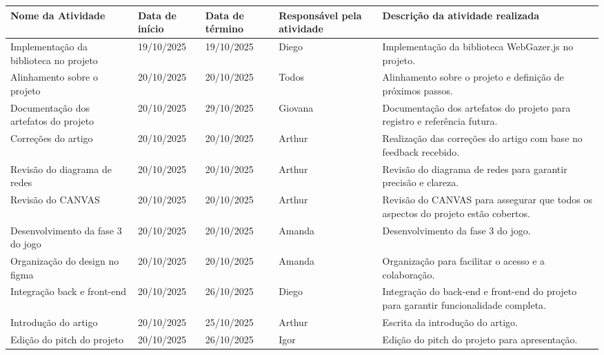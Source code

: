 \documentclass[
landscape,
  a4paper,%
  12pt,%
  english,%
  brazilian,%
]{article}
\begin{document}
\begin{table}[]
\begin{tabular}{|p{5cm}|l|l|l|p{8cm}|}
\end{tabular}
\end{table}

\break

 \begin{table}[]
\centering
\begin{tabular}{|p{5cm}|l|l|l|p{8cm}|}
\hline
Nome da Atividade & Data de início & Data de término & Responsável pela atividade & Descrição da atividade realizada \\ \hline
Implementação da biblioteca no projeto & 19/10/2025 & 19/10/2025 & Diego   & Implementação da biblioteca WebGazer.js no projeto. \\ \hline
Alinhamento sobre o projeto                        & 20/10/2025  & 20/10/2025 & Todos   & Alinhamento sobre o projeto e definição de próximos passos. \\ \hline
Documentação dos artefatos do projeto             & 20/10/2025  & 29/10/2025 & Giovana   & Documentação dos artefatos do projeto para registro e referência futura. \\ \hline
Correções do artigo                                & 20/10/2025  & 20/10/2025 & Arthur   & Realização das correções do artigo com base no feedback recebido. \\ \hline
Revisão do diagrama de redes                       & 20/10/2025  & 20/10/2025 & Arthur   & Revisão do diagrama de redes para garantir precisão e clareza. \\ \hline
Revisão do CANVAS                                 & 20/10/2025  & 20/10/2025 & Arthur   & Revisão do CANVAS para assegurar que todos os aspectos do projeto estão cobertos. \\ \hline
Desenvolvimento da fase 3 do jogo                 & 20/10/2025  & 20/10/2025 & Amanda   & Desenvolvimento da fase 3 do jogo. \\ \hline
Organização do design no figma                    & 20/10/2025  & 20/10/2025 & Amanda   & Organização para facilitar o acesso e a colaboração. \\ \hline
Integração back e front-end                       & 20/10/2025  & 26/10/2025 & Diego   & Integração do back-end e front-end do projeto para garantir funcionalidade completa. \\ \hline
Introdução do artigo                               & 20/10/2025 & 25/10/2025 & Arthur   & Escrita da introdução do artigo. \\ \hline
Edição do pitch do projeto                          & 20/10/2025 & 26/10/2025 & Igor   & Edição do pitch do projeto para apresentação. \\ \hline

\end{tabular}
\end{table}
\end{document}
